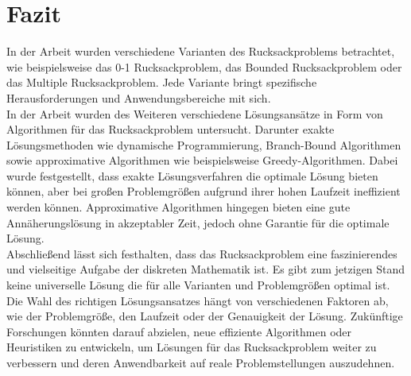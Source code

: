 \chapter{Fazit}

In der Arbeit wurden verschiedene Varianten des Rucksackproblems betrachtet,
wie beispielsweise das 0-1 Rucksackproblem, das Bounded Rucksackproblem oder das Multiple Rucksackproblem. 
Jede Variante bringt spezifische Herausforderungen und Anwendungsbereiche mit sich.
\\
In der Arbeit wurden des Weiteren verschiedene Lösungsansätze
in Form von Algorithmen für das Rucksackproblem untersucht.
Darunter exakte Lösungsmethoden wie dynamische Programmierung, Branch-Bound Algorithmen 
sowie approximative Algorithmen wie beispielsweise Greedy-Algorithmen. 
Dabei wurde festgestellt, dass exakte Lösungsverfahren die optimale Lösung bieten können, 
aber bei großen Problemgrößen aufgrund ihrer hohen Laufzeit ineffizient werden können. 
Approximative Algorithmen hingegen bieten eine gute Annäherungslösung in akzeptabler Zeit, 
jedoch ohne Garantie für die optimale Lösung.
\\

Abschließend lässt sich festhalten, dass das Rucksackproblem eine faszinierendes und vielseitige Aufgabe der diskreten Mathematik ist.
Es gibt zum jetzigen Stand keine universelle Lösung die für alle Varianten und Problemgrößen optimal ist. 
Die Wahl des richtigen Lösungsansatzes hängt von verschiedenen Faktoren ab, wie der Problemgröße, den Laufzeit oder der Genauigkeit der Lösung. 
Zukünftige Forschungen könnten darauf abzielen, neue effiziente Algorithmen oder Heuristiken zu entwickeln,
um Lösungen für das Rucksackproblem weiter zu verbessern und deren Anwendbarkeit auf reale Problemstellungen auszudehnen.